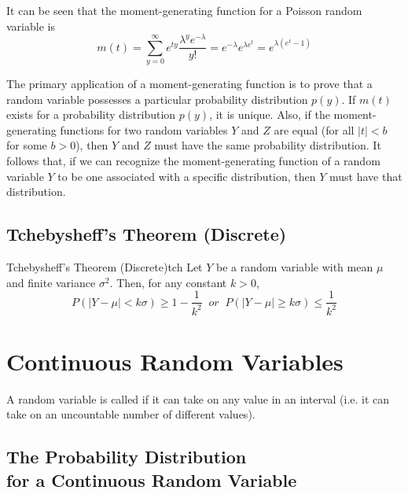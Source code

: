 \documentclass[12pt, a4paper, twoside, openright, titlepage]{book}
\begin{document}
\begin{rmk}{}{}
    It can be seen that the moment-generating function for a Poisson random variable is \begin{equation*}
        m(t) = \sum\limits_{y=0}^{\infty}e^{ty}\frac{\lambda^ye^{-\lambda}}{y!} = e^{-\lambda}e^{\lambda e^t} = e^{\lambda(e^t-1)}
    \end{equation*}
\end{rmk}

The primary application of a moment-generating function is to prove that a random variable possesses a particular probability distribution $p(y)$. If $m(t)$ exists for a probability distribution $p(y)$, it is unique. Also, if the moment-generating functions for two random variables $Y$ and $Z$ are equal (for all $|t| < b$ for some $b > 0$), then $Y$ and $Z$ must have the same probability distribution. It follows that, if we can recognize the moment-generating function of a random variable $Y$ to be one associated with a specific distribution, then $Y$ must have that distribution.


\section{\textsection Tchebysheff's Theorem (Discrete)}

\begin{namthm}{Tchebysheff's Theorem (Discrete)}{tch}
    Let $Y$ be a random variable with mean $\mu$ and finite variance $\sigma^2$. Then, for any constant $k > 0$, \begin{equation*}
        P(|Y-\mu|<k\sigma) \geq 1 - \frac{1}{k^2}\;\;or\;\;P(|Y-\mu|\geq k\sigma) \leq \frac{1}{k^2}
    \end{equation*}
\end{namthm}


\chapter{Continuous Random Variables}

A random variable is called  if it can take on any value in an interval (i.e. it can take on an uncountable number of different values).



\section[\textsection The Probability Distribution for a Continuous Random Variable]{\textsection The Probability Distribution \\ for a Continuous Random Variable}
\end{document}
